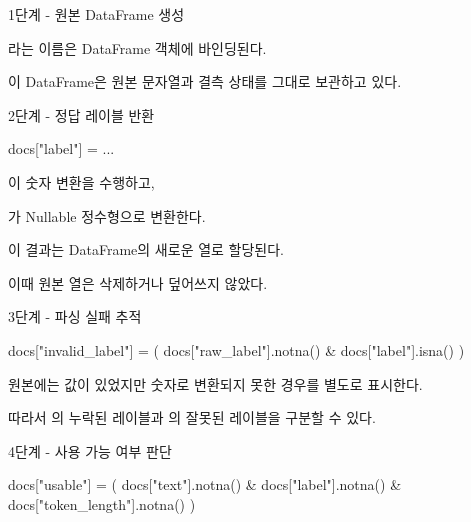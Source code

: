 \begin{dhknote}
\begin{dhksmry}[centered]
1단계 - 원본 DataFrame 생성
\end{dhksmry}
\end{dhknote}

라는 이름은 DataFrame 객체에 바인딩된다.

이 DataFrame은 원본 문자열과 결측 상태를 그대로 보관하고 있다.

\begin{dhknote}
\begin{dhksmry}[centered]
2단계 - 정답 레이블 반환
\end{dhksmry}
\end{dhknote}

\begin{dhkcode}
docs["label"] = ...
\end{dhkcode}

이 숫자 변환을 수행하고, 

가 Nullable 정수형으로 변환한다.

이 결과는 DataFrame의 새로운 열로 할당된다.

이때 원본  열은 삭제하거나 덮어쓰지 않았다.

\begin{dhknote}
\begin{dhksmry}[centered]
3단계 - 파싱 실패 추적
\end{dhksmry}
\end{dhknote}

\begin{dhkcode}
docs["invalid_label"] = (
    docs["raw_label"].notna()
    & docs["label"].isna()
)
\end{dhkcode}

원본에는 값이 있었지만 숫자로 변환되지 못한 경우를 별도로 표시한다.

따라서 의 누락된 레이블과 의 잘못된 레이블을 구분할 수 있다.

\begin{dhknote}
\begin{dhksmry}[centered]
4단계 - 사용 가능 여부 판단
\end{dhksmry}
\end{dhknote}

\begin{dhkcode}
docs["usable"] = (
    docs["text"].notna()
    & docs["label"].notna()
    & docs["token_length"].notna()
)
\end{dhkcode}

